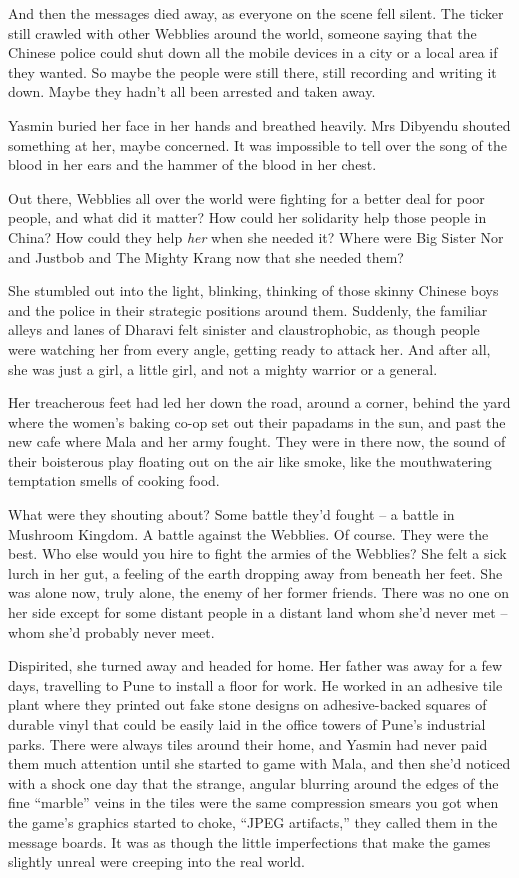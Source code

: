 And then the messages died away, as everyone on the scene fell
silent. The ticker still crawled with other Webblies around the
world, someone saying that the Chinese police could shut down all
the mobile devices in a city or a local area if they wanted. So
maybe the people were still there, still recording and writing it
down. Maybe they hadn't all been arrested and taken away.

Yasmin buried her face in her hands and breathed heavily. Mrs
Dibyendu shouted something at her, maybe concerned. It was
impossible to tell over the song of the blood in her ears and the
hammer of the blood in her chest.

Out there, Webblies all over the world were fighting for a better
deal for poor people, and what did it matter? How could her
solidarity help those people in China? How could they help
\emph{her} when she needed it? Where were Big Sister Nor and
Justbob and The Mighty Krang now that she needed them?

She stumbled out into the light, blinking, thinking of those skinny
Chinese boys and the police in their strategic positions around
them. Suddenly, the familiar alleys and lanes of Dharavi felt
sinister and claustrophobic, as though people were watching her
from every angle, getting ready to attack her. And after all, she
was just a girl, a little girl, and not a mighty warrior or a
general.

Her treacherous feet had led her down the road, around a corner,
behind the yard where the women's baking co-op set out their
papadams in the sun, and past the new cafe where Mala and her army
fought. They were in there now, the sound of their boisterous play
floating out on the air like smoke, like the mouthwatering
temptation smells of cooking food.

What were they shouting about? Some battle they'd fought -- a
battle in Mushroom Kingdom. A battle against the Webblies. Of
course. They were the best. Who else would you hire to fight the
armies of the Webblies? She felt a sick lurch in her gut, a feeling
of the earth dropping away from beneath her feet. She was alone
now, truly alone, the enemy of her former friends. There was no one
on her side except for some distant people in a distant land whom
she'd never met -- whom she'd probably never meet.

Dispirited, she turned away and headed for home. Her father was
away for a few days, travelling to Pune to install a floor for
work. He worked in an adhesive tile plant where they printed out
fake stone designs on adhesive-backed squares of durable vinyl that
could be easily laid in the office towers of Pune's industrial
parks. There were always tiles around their home, and Yasmin had
never paid them much attention until she started to game with Mala,
and then she'd noticed with a shock one day that the strange,
angular blurring around the edges of the fine ``marble'' veins in the
tiles were the same compression smears you got when the game's
graphics started to choke, ``JPEG artifacts,'' they called them in
the message boards. It was as though the little imperfections that
make the games slightly unreal were creeping into the real world.

